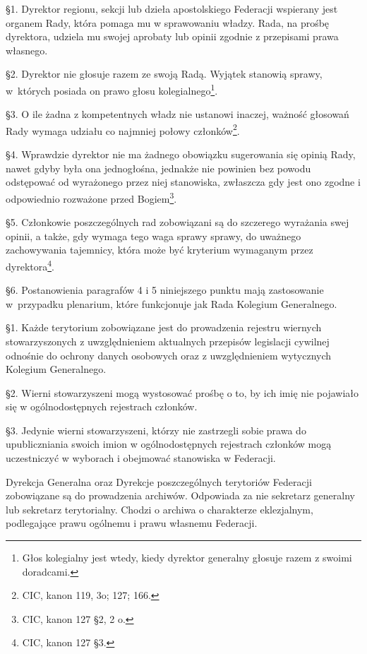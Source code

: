 
 \S{}1. Dyrektor regionu, sekcji lub dzieła apostolskiego Federacji wspierany jest organem Rady, która pomaga mu w sprawowaniu władzy. Rada, na prośbę dyrektora, udziela mu swojej aprobaty lub opinii zgodnie z przepisami prawa własnego.

\S{}2. Dyrektor nie głosuje razem ze swoją Radą. Wyjątek stanowią sprawy, \mbox{w których} posiada on prawo głosu kolegialnego\footnote{Głos kolegialny jest wtedy, kiedy dyrektor generalny głosuje razem z swoimi doradcami.}.

\S{}3. O ile żadna z kompetentnych władz nie ustanowi inaczej, ważność głosowań Rady wymaga udziału co najmniej połowy członków\footnote{CIC, kanon 119, 3o; 127; 166.}.

\S{}4. Wprawdzie dyrektor nie ma żadnego obowiązku sugerowania się opinią Rady, nawet gdyby była ona jednogłośna, jednakże nie powinien bez powodu odstępować od wyrażonego przez niej stanowiska, zwłaszcza gdy jest ono zgodne i odpowiednio rozważone przed Bogiem\footnote{CIC, kanon 127 \S{}2, 2 o.}.

\S{}5. Członkowie poszczególnych rad zobowiązani są do szczerego wyrażania swej opinii, a także, gdy wymaga tego waga sprawy sprawy, do uważnego zachowywania tajemnicy, która może być kryterium wymaganym przez dyrektora\footnote{CIC, kanon 127 \S{}3.}.

\S{}6. Postanowienia paragrafów 4 i 5 niniejszego punktu mają zastosowanie \mbox{w przypadku} plenarium, które funkcjonuje jak Rada Kolegium Generalnego.


 \S{}1. Każde terytorium zobowiązane jest do prowadzenia rejestru wiernych stowarzyszonych z uwzględnieniem aktualnych przepisów legislacji cywilnej odnośnie do ochrony danych osobowych oraz z uwzględnieniem wytycznych Kolegium Generalnego.

\S{}2. Wierni stowarzyszeni mogą wystosować prośbę o to, by ich imię nie pojawiało się w ogólnodostępnych rejestrach członków.

\S{}3. Jedynie wierni stowarzyszeni, którzy nie zastrzegli sobie prawa do upubliczniania swoich imion w ogólnodostępnych rejestrach członków mogą uczestniczyć w wyborach i obejmować stanowiska w Federacji.


 Dyrekcja Generalna oraz Dyrekcje poszczególnych terytoriów Federacji zobowiązane są do prowadzenia archiwów. Odpowiada za nie sekretarz generalny lub sekretarz terytorialny. Chodzi o archiwa o charakterze eklezjalnym, podlegające prawu ogólnemu i prawu własnemu Federacji.

